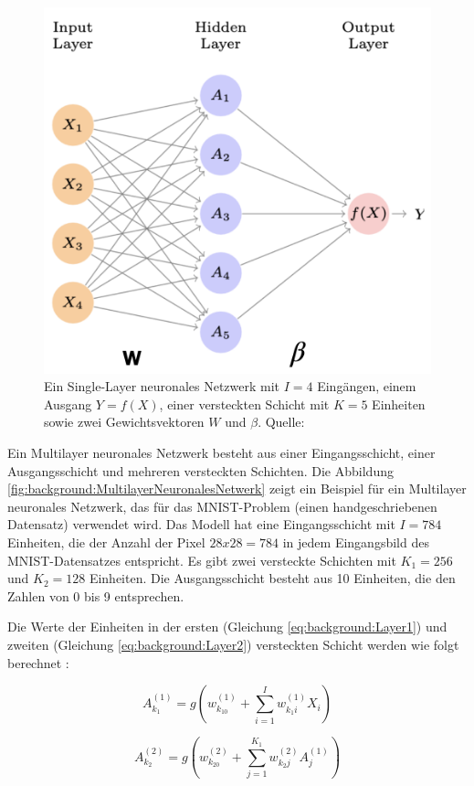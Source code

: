     \begin{figure}
        \centering
        \includegraphics[width=0.5\linewidth]{gfx/NeuralNet/SingleLayer.png}
        \caption[Single-Layer neuronales Netzwerk]{Ein Single-Layer neuronales Netzwerk mit $I = 4$ Eingängen, einem Ausgang $Y = f(X)$, einer versteckten Schicht mit $K = 5$ Einheiten sowie zwei Gewichtsvektoren $W$ und $\beta$. Quelle: \cite{introAI}}
        \label{fig:background:SingleLayerNeuralNetwork}
    \end{figure}

    Ein Multilayer neuronales Netzwerk besteht aus einer Eingangsschicht, einer Ausgangsschicht und mehreren versteckten Schichten. Die Abbildung \ref{fig:background:MultilayerNeuronalesNetwerk} zeigt ein Beispiel für ein Multilayer neuronales Netzwerk, das für das MNIST-Problem (einen handgeschriebenen Datensatz) \cite{MNIST} verwendet wird. Das Modell hat eine Eingangsschicht mit $I = 784$ Einheiten, die der Anzahl der Pixel $28 x 28 = 784$ in jedem Eingangsbild des MNIST-Datensatzes entspricht. Es gibt zwei versteckte Schichten mit $K_1 = 256$ und $K_2 = 128$ Einheiten. Die Ausgangsschicht besteht aus 10 Einheiten, die den Zahlen von 0 bis 9 entsprechen.
    
    Die Werte der Einheiten in der ersten (Gleichung \ref{eq:background:Layer1}) und zweiten (Gleichung \ref{eq:background:Layer2}) versteckten Schicht werden wie folgt berechnet \cite{introAI}:

    \begin{equation}
        A_{k_1}^{(1)} = g(w_{k_10}^{(1)} + \sum_{i = 1}^{I} w_{k_1i}^{(1)} X_i) 
    \label{eq:background:Layer1}
    \end{equation}

    \begin{equation}
        A_{k_2}^{(2)} = g(w_{k_20}^{(2)} + \sum_{j = 1}^{K_1} w_{k_2j}^{(2)} A_j^{(1)}) 
    \label{eq:background:Layer2}
    \end{equation}

